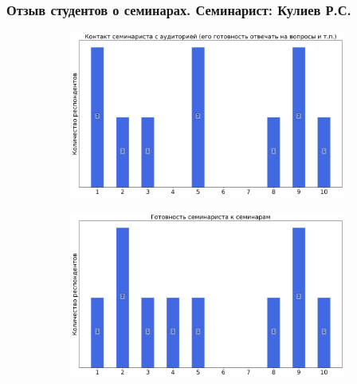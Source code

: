     
    \subsubsection{Отзыв студентов о семинарах. Семинарист: Кулиев Р.С.}
        \begin{figure}[H]
            \centering
            \begin{subfigure}[b]{0.45\textwidth}
                \centering
                \includegraphics[width=\textwidth]{images/2 course/Компьютерные технологии/seminarists-marks-Кулиев Р.С.-0.png}
            \end{subfigure}
            \begin{subfigure}[b]{0.45\textwidth}
                \centering
                \includegraphics[width=\textwidth]{images/2 course/Компьютерные технологии/seminarists-marks-Кулиев Р.С.-1.png}
            \end{subfigure}
            \begin{subfigure}[b]{0.45\textwidth}
                \centering

\end{subfigure}
\end{figure}
